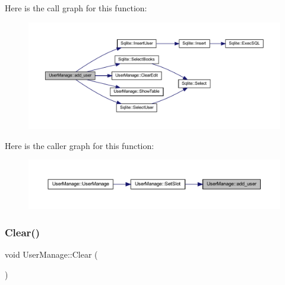 Here is the call graph for this function\+:
\nopagebreak
\begin{figure}[H]
\begin{center}
\leavevmode
\includegraphics[width=350pt]{class_user_manage_a7058bbb981e4c6b3064c3e5e334ac700_cgraph}
\end{center}
\end{figure}
Here is the caller graph for this function\+:
\nopagebreak
\begin{figure}[H]
\begin{center}
\leavevmode
\includegraphics[width=350pt]{class_user_manage_a7058bbb981e4c6b3064c3e5e334ac700_icgraph}
\end{center}
\end{figure}
\mbox{\label{class_user_manage_af3849a855fdde995372d3162fb358472}} 
\subsubsection{\texorpdfstring{Clear()}{Clear()}}
{\footnotesize\ttfamily void User\+Manage\+::\+Clear (\begin{DoxyParamCaption}{ }\end{DoxyParamCaption})}

